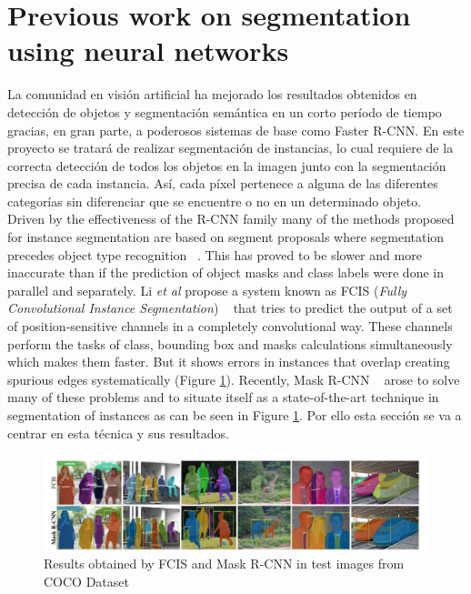 \documentclass{bmvc2k}
\def\etal{\emph{et al}\bmvaOneDot}
\begin{document}
\section{Previous work on segmentation using neural networks}
La comunidad en visión artificial ha mejorado los resultados obtenidos en detección de objetos y segmentación semántica en un corto período de tiempo gracias, en gran parte, a poderosos sistemas de base como Faster R-CNN. En este proyecto se tratará de realizar segmentación de instancias, lo cual requiere de la correcta detección de todos los objetos en la imagen junto con la segmentación precisa de cada instancia. Así, cada píxel pertenece a alguna de las diferentes categorías sin diferenciar que se encuentre o no en un determinado objeto.\\ %
Driven by the effectiveness of the R-CNN family many of the methods proposed for instance segmentation are based on segment proposals where segmentation precedes object type recognition ~\cite{pinheiro2015learning}. This has proved to be slower and more inaccurate than if the prediction of object masks and class labels were done in parallel and separately. Li \etal{} propose a system known as FCIS (\textit{Fully Convolutional Instance Segmentation}) ~\cite{li2016fully} that tries to predict the output of a set of position-sensitive channels in a completely convolutional way. These channels perform the tasks of class, bounding box and masks calculations simultaneously which makes them faster. But it shows errors in instances that overlap creating spurious edges systematically (Figure \ref{fig:fcis_mask}).
Recently, Mask R-CNN ~\cite{he2017mask} arose to solve many of these problems and to situate itself as a state-of-the-art technique in segmentation of instances as can be seen in Figure \ref{fig:fcis_mask}. Por ello esta sección se va a centrar en esta técnica y sus resultados.\\ %
\begin{figure}[H]
\begin{center}
\includegraphics[scale=0.30]{fcis_vs_maskrcnn.png}
\caption{Results obtained by FCIS and Mask R-CNN in test images from COCO Dataset}
\label{fig:fcis_mask}
\end{center}
\end{figure}
\end{document}
